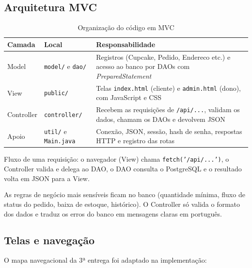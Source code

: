 \documentclass[12pt]{article}
\begin{document}
\subsection{Arquitetura MVC}

\begin{table}[H]
\centering
\small
\renewcommand{\arraystretch}{1.3}
\begin{tabular}{|p{2.2cm}|p{4.3cm}|p{7.2cm}|}
\hline
\rowcolor{gray!40} \textbf{Camada} & \textbf{Local} & \textbf{Responsabilidade} \\ \hline
Model & \texttt{model/} e \texttt{dao/} & Registros (Cupcake, Pedido, Endereco etc.) e acesso ao banco por DAOs com \textit{PreparedStatement} \\ \hline
View & \texttt{public/} & Telas \texttt{index.html} (cliente) e \texttt{admin.html} (dono), com JavaScript e CSS \\ \hline
Controller & \texttt{controller/} & Recebem as requisições de \texttt{/api/...}, validam os dados, chamam os DAOs e devolvem JSON \\ \hline
Apoio & \texttt{util/} e \texttt{Main.java} & Conexão, JSON, sessão, hash de senha, respostas HTTP e registro das rotas \\ \hline
\end{tabular}
\caption{Organização do código em MVC}
\end{table}

Fluxo de uma requisição: o navegador (View) chama \texttt{fetch('/api/...')}, o Controller valida e delega ao DAO, o DAO consulta o PostgreSQL e o resultado volta em JSON para a View.

As regras de negócio mais sensíveis ficam no banco (quantidade mínima, fluxo de status do pedido, baixa de estoque, histórico). O Controller só valida o formato dos dados e traduz os erros do banco em mensagens claras em português.

\subsection{Telas e navegação}

O mapa navegacional da 3ª entrega foi adaptado na implementação:
\end{document}
